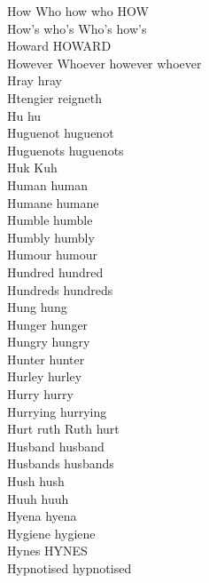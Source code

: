 How Who how who HOW\\
How's who's Who's how's\\
Howard HOWARD\\
However Whoever however whoever\\
Hray hray\\
Htengier reigneth\\
Hu hu\\
Huguenot huguenot\\
Huguenots huguenots\\
Huk Kuh\\
Human human\\
Humane humane\\
Humble humble\\
Humbly humbly\\
Humour humour\\
Hundred hundred\\
Hundreds hundreds\\
Hung hung\\
Hunger hunger\\
Hungry hungry\\
Hunter hunter\\
Hurley hurley\\
Hurry hurry\\
Hurrying hurrying\\
Hurt ruth Ruth hurt\\
Husband husband\\
Husbands husbands\\
Hush hush\\
Huuh huuh\\
Hyena hyena\\
Hygiene hygiene\\
Hynes HYNES\\
Hypnotised hypnotised\\

